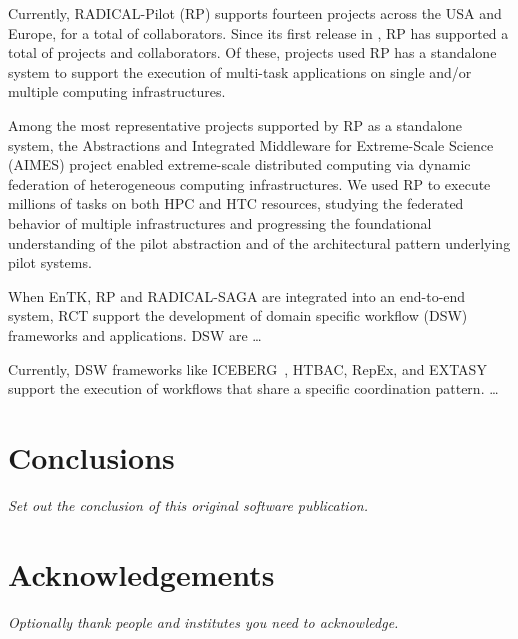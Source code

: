 \documentclass[preprint,12pt, a4paper]{elsarticle}
\begin{document}
Currently, RADICAL-Pilot (RP) supports fourteen projects across the USA and
Europe, for a total of  collaborators. Since its first
release in , RP has supported a total of
 projects and  collaborators. Of
these,  projects used RP has a standalone system to
support the execution of multi-task applications on single and/or multiple
computing infrastructures. 

Among the most representative projects supported by RP as a standalone
system, the Abstractions and Integrated Middleware for Extreme-Scale Science
(AIMES) project enabled extreme-scale distributed computing via dynamic
federation of heterogeneous computing infrastructures. We used RP to execute
millions of tasks on both HPC and HTC resources, studying the federated
behavior of multiple infrastructures and progressing the foundational
understanding of the pilot abstraction and of the architectural pattern
underlying pilot systems.


When EnTK, RP and RADICAL-SAGA are integrated into an end-to-end system, RCT
support the development of domain specific workflow (DSW) frameworks and
applications. DSW are \ldots

Currently, DSW frameworks like ICEBERG~\cite{}, HTBAC, RepEx, and EXTASY support the execution of workflows that share a specific coordination pattern. \ldots


\section{Conclusions}\label{sec:conclusions}

{\em Set out the conclusion of this original software publication.}


\section*{Acknowledgements}

{\em Optionally thank people and institutes you need to acknowledge. }
\end{document}
